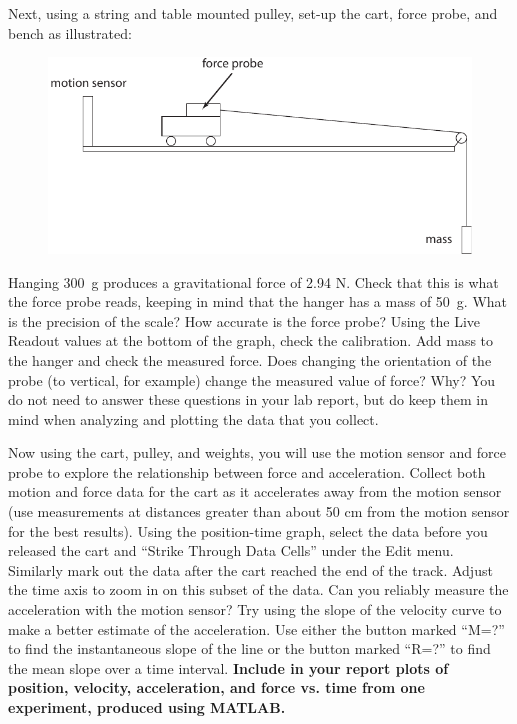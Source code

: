 \documentclass[11pt,letterpaper]{article}
\newcounter{question}[section]
\begin{document}
Next, using a string and table mounted pulley, set-up the cart, force probe, and bench as illustrated:

\begin{figure}[h]
\begin{center}
\includegraphics[]{./cart_and_pulley}
\end{center}
\end{figure}


Hanging 300~g produces a gravitational force of 2.94 N.  Check that this is what the force probe reads, keeping in mind that the hanger has a mass of 50~g.  What is the precision of the scale? How accurate is the force probe?  Using the Live Readout values at the bottom of the graph, check the calibration. Add mass to the hanger and check the measured force.  Does changing the orientation of the probe (to vertical, for example) change the measured value of force? Why? You do not need to answer these questions in your lab report, but do keep them in mind when analyzing and plotting the data that you collect.

Now using the cart, pulley, and weights, you will use the motion sensor and force probe to explore the relationship between force and acceleration. Collect both motion and force data for the cart as it accelerates away from the motion sensor (use measurements at distances greater than about 50 cm from the motion sensor for the best results).  Using the position-time graph, select the data before you released the cart and ``Strike Through Data Cells'' under the Edit menu.  Similarly mark out the data after the cart reached the end of the track.  Adjust the time axis to zoom in on this subset of the data.  Can you reliably measure the acceleration with the motion sensor?  Try using the slope of the velocity curve to make a better estimate of the
acceleration. Use either the button marked ``M=?'' to find the instantaneous slope of the line or the button marked ``R=?'' to find the mean slope over a time interval. \textbf{Include in your report plots of position, velocity, acceleration, and force vs. time from one experiment, produced using MATLAB.}%
\end{document}

